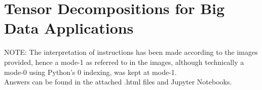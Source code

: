 \documentclass[12pt]{article}
\numberwithin{equation}{section}
\begin{document}
	
\section{Tensor Decompositions for Big Data Applications} \label{sec: 5-TD-BD}
	NOTE: The interpretation of instructions has been made according to the images provided, hence a mode-1 as referred to in the images, although technically a mode-0 using Python's 0 indexing, was kept at mode-1.\\
	
	Answers can be found in the attached .html files and Jupyter Notebooks.
	
\end{document}
